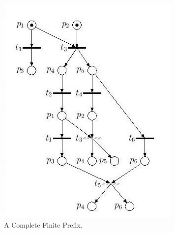 \documentclass{beamer}
\begin{document}
\begin{frame}
\begin{columns}[c]
\begin{figure}
\includegraphics[width=1.1\linewidth,height=\textheight,keepaspectratio]{loic_unfolding.jpg}
\caption{A Complete Finite Prefix.}
\end{figure}

\end{columns}
\end{frame}
\end{document}
